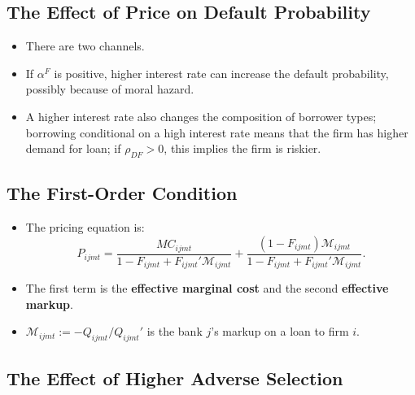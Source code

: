 \documentclass[
]{book}
\providecommand{\tightlist}{%
  \setlength{\itemsep}{0pt}\setlength{\parskip}{0pt}}
\begin{document}
\hypertarget{the-effect-of-price-on-default-probability}{%
\subsection{The Effect of Price on Default Probability}\label{the-effect-of-price-on-default-probability}}

\begin{itemize}
\tightlist
\item
  There are two channels.
\item
  If \(\alpha^F\) is positive, higher interest rate can increase the default probability, possibly because of moral hazard.
\item
  A higher interest rate also changes the composition of borrower types; borrowing conditional on a high interest rate means that the firm has higher demand for loan; if \(\rho_{DF} > 0\), this implies the firm is riskier.
\end{itemize}

\hypertarget{the-first-order-condition}{%
\subsection{The First-Order Condition}\label{the-first-order-condition}}

\begin{itemize}
\tightlist
\item
  The pricing equation is:
  \[
  P_{ijmt} = \frac{MC_{ijmt}}{1 - F_{ijmt} + F_{ijmt}' \mathcal{M}_{ijmt}} + \frac{(1 - F_{ijmt}) \mathcal{M}_{ijmt}}{1 - F_{ijmt} + F_{ijmt}' \mathcal{M}_{ijmt}}.
  \]
\item
  The first term is the \textbf{effective marginal cost} and the second \textbf{effective markup}.
\item
  \(\mathcal{M}_{ijmt} := - Q_{ijmt} / Q_{ijmt}'\) is the bank \(j\)'s markup on a loan to firm \(i\).
\end{itemize}

\hypertarget{the-effect-of-higher-adverse-selection}{%
\subsection{The Effect of Higher Adverse Selection}\label{the-effect-of-higher-adverse-selection}}
\end{document}
